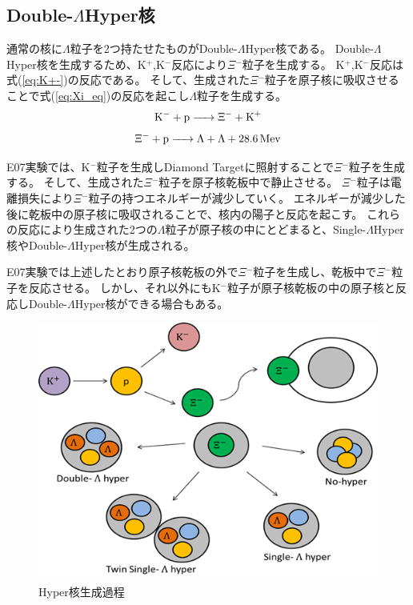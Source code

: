 \documentclass[12pt,a4paper]{jarticle}
\begin{document}
\subsection{Double-$\Lambda$Hyper核}
通常の核に$\Lambda$粒子を2つ持たせたものがDouble-$\Lambda$Hyper核である。
Double-$\Lambda$Hyper核を生成するため、K$^+$,K$^-$反応により$\Xi$$^-$粒子を生成する。
K$^+$,K$^-$反応は式(\ref{eq:K+-})の反応である。
そして、生成された$\Xi$$^-$粒子を原子核に吸収させることで式(\ref{eq:Xi_eq})の反応を起こし$\Lambda$粒子を生成する。
\begin{equation}
	\ce{K- + p -> $\Xi$- + K+}
\label{eq:K+-}
\end{equation}
\begin{equation}
	\ce{$\Xi$- + p -> $\Lambda$ + $\Lambda$ + 28.6Mev}
\label{eq:Xi_eq}
\end{equation}
\par
E07実験では、K$^-$粒子を生成しDiamond Targetに照射することで$\Xi$$^-$粒子を生成する。
そして、生成された$\Xi$$^-$粒子を原子核乾板中で静止させる。
$\Xi$$^-$粒子は電離損失により$\Xi$$^-$粒子の持つエネルギーが減少していく。
エネルギーが減少した後に乾板中の原子核に吸収されることで、核内の陽子と反応を起こす。
これらの反応により生成された2つの$\Lambda$粒子が原子核の中にとどまると、Single-$\Lambda$Hyper核やDouble-$\Lambda$Hyper核が生成される。
\par
E07実験では上述したとおり原子核乾板の外で$\Xi$$^-$粒子を生成し、乾板中で$\Xi$$^-$粒子を反応させる。
しかし、それ以外にもK$^-$粒子が原子核乾板の中の原子核と反応しDouble-$\Lambda$Hyper核ができる場合もある。
\par
\begin{figure}[htbp]
  \centering
     \includegraphics[width=120mm]{makehyper.png}
  \caption{Hyper核生成過程\label{fig:makehyper}}
\end{figure}
\newpage
\end{document}
